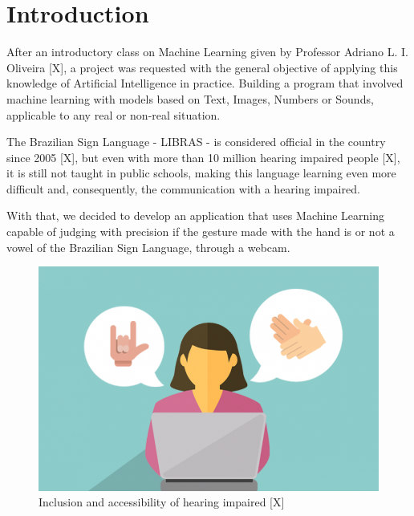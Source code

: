 \documentclass[a4paper, 12pt]{article}
\begin{document}
\newpage
\tableofcontents
\thispagestyle{empty}

\newpage
{}

\section{Introduction}

After an introductory class on Machine Learning given by Professor Adriano L. I. Oliveira [X], a project was requested with the general objective of applying this knowledge of Artificial Intelligence in practice. Building a program that involved machine learning with models based on Text, Images, Numbers or Sounds, applicable to any real or non-real situation.

The Brazilian Sign Language - LIBRAS - is considered official in the country since 2005 [X], but even with more than 10 million hearing impaired people [X], it is still not taught in public schools, making this language learning even more difficult and, consequently, the communication with a hearing impaired.

With that, we decided to develop an application that uses Machine Learning capable of judging with precision if the gesture made with the hand is or not a vowel of the Brazilian Sign Language, through a webcam.

\begin{figure}[!ht]
\centering
\includegraphics[scale=0.2]{img/inclusion.png}
\caption{Inclusion and accessibility of hearing impaired [X]}
\label{figure_1}
\end{figure}
\end{document}
